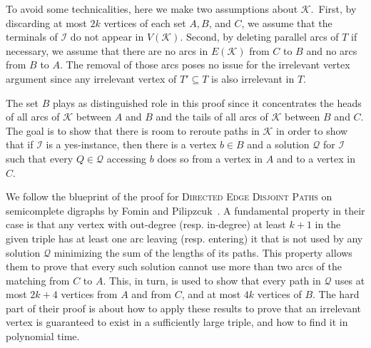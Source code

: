 \documentclass[a4paper,UKenglish,cleveref, autoref, thm-restate]{lipics-v2021}
\begin{document}
To avoid some technicalities, here we make two assumptions about $\mathcal{K}$.\
First, by discarding at most $2k$ vertices of each set $A, B$, and $C$, we assume that the terminals of $\mathcal{I}$ do not appear in $V(\mathcal{K})$.
Second, by deleting parallel arcs of $T$ if necessary, we assume that there are no arcs in $E(\mathcal{K})$ from $C$ to $B$ and no arcs from $B$ to $A$.
The removal of those arcs poses no issue for the irrelevant vertex argument since any irrelevant vertex of $T' \subseteq T$ is also irrelevant in $T$.

The set $B$ plays as distinguished role in this proof since it concentrates the heads of all arcs of $\mathcal{K}$ between $A$ and $B$ and the tails of all arcs of $\mathcal{K}$ between $B$ and $C$.
The goal is to show that there is room to reroute paths in $\mathcal{K}$ in order to show that if $\mathcal{I}$ is a  {\sf yes}-instance, then there is a vertex $b \in B$ and a solution $\mathcal{Q}$ for $\mathcal{I}$ such that every $Q \in \mathcal{Q}$ accessing $b$ does so from a vertex in $A$ and to a vertex in $C$.




We follow the blueprint of the proof for \textsc{Directed Edge Disjoint Paths} on semicomplete
digraphs by Fomin and Pilipzcuk~\cite{FominP19}.
A fundamental property in their case is that any vertex with out-degree (resp. in-degree) at
least $k+1$ in the given triple has at least one arc leaving (resp. entering) it that is not
used by any solution $\mathcal{Q}$ minimizing the sum of the lengths of its paths.
This property allows them to prove that every such solution cannot use more than
two arcs of the matching from $C$ to $A$.
This, in turn, is used to show that every path in $\mathcal{Q}$ uses at most $2k+4$ vertices from
$A$ and from $C$, and at most $4k$ vertices of $B$.
The hard part of their proof is about how to apply these results to prove that an irrelevant
vertex is guaranteed to exist in a sufficiently large triple, and how to find it in polynomial time.
\end{document}
